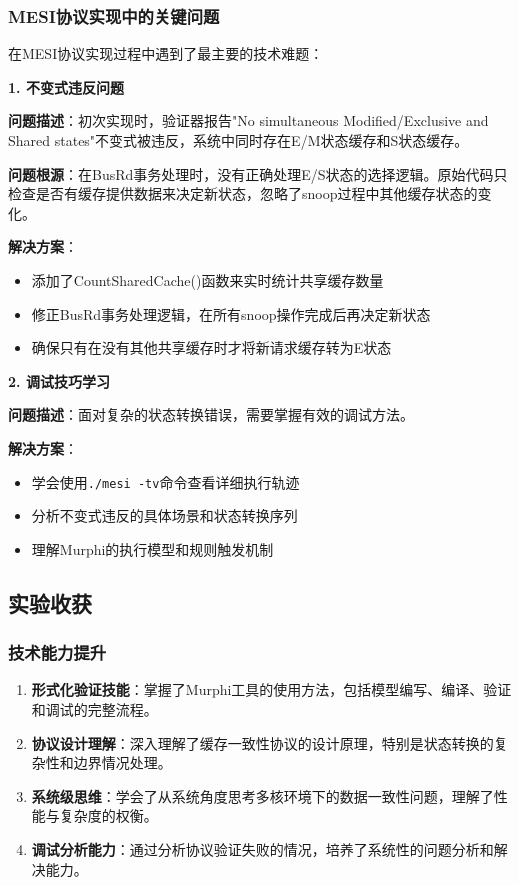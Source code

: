\documentclass[a4paper]{article}
\begin{document}
\subsubsection{MESI协议实现中的关键问题}

在MESI协议实现过程中遇到了最主要的技术难题：

\textbf{1. 不变式违反问题}

\textbf{问题描述}：初次实现时，验证器报告"No simultaneous Modified/Exclusive and Shared states"不变式被违反，系统中同时存在E/M状态缓存和S状态缓存。

\textbf{问题根源}：在BusRd事务处理时，没有正确处理E/S状态的选择逻辑。原始代码只检查是否有缓存提供数据来决定新状态，忽略了snoop过程中其他缓存状态的变化。

\textbf{解决方案}：
\begin{itemize}
    \item 添加了CountSharedCache()函数来实时统计共享缓存数量
    \item 修正BusRd事务处理逻辑，在所有snoop操作完成后再决定新状态
    \item 确保只有在没有其他共享缓存时才将新请求缓存转为E状态
\end{itemize}

\textbf{2. 调试技巧学习}

\textbf{问题描述}：面对复杂的状态转换错误，需要掌握有效的调试方法。

\textbf{解决方案}：
\begin{itemize}
    \item 学会使用\texttt{./mesi -tv}命令查看详细执行轨迹
    \item 分析不变式违反的具体场景和状态转换序列
    \item 理解Murphi的执行模型和规则触发机制
\end{itemize}

\subsection{实验收获}

\subsubsection{技术能力提升}

\begin{enumerate}
    \item \textbf{形式化验证技能}：掌握了Murphi工具的使用方法，包括模型编写、编译、验证和调试的完整流程。

    \item \textbf{协议设计理解}：深入理解了缓存一致性协议的设计原理，特别是状态转换的复杂性和边界情况处理。

    \item \textbf{系统级思维}：学会了从系统角度思考多核环境下的数据一致性问题，理解了性能与复杂度的权衡。

    \item \textbf{调试分析能力}：通过分析协议验证失败的情况，培养了系统性的问题分析和解决能力。
\end{enumerate}
\end{document}
